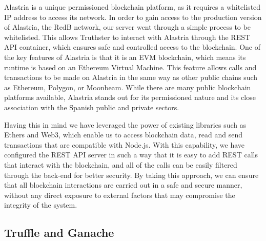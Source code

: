 \documentclass[target=mst,aauheader=]{thud}
\begin{document}
Alastria is a unique permissioned blockchain platform, as it requires a whitelisted IP address to access its network. In order to gain access to the production version of Alastria, the RedB network, our server went through a simple process to be whitelisted. This allows Truthster to interact with Alastria through the REST API container, which ensures safe and controlled access to the blockchain.
One of the key features of Alastria is that it is an EVM blockchain, which means its runtime is based on an Ethereum Virtual Machine\cite{evm}. This feature allows calls and transactions to be made on Alastria in the same way as other public chains such as Ethereum\cite{ethereum}, Polygon\cite{polygon}, or Moonbeam\cite{moonbeam}. While there are many public blockchain platforms available, Alastria stands out for its permissioned nature and its close association with the Spanish public and private sectors.\par
Having this in mind we have leveraged the power of existing libraries such as Ethers\cite{ethers} and Web3\cite{web3}, which enable us to access blockchain data, read and send transactions that are compatible with Node.js. With this capability, we have configured the REST API server in such a way that it is easy to add REST calls that interact with the blockchain, and all of the calls can be easily filtered through the back-end for better security. By taking this approach, we can ensure that all blockchain interactions are carried out in a safe and secure manner, without any direct exposure to external factors that may compromise the integrity of the system.

\subsection{Truffle and Ganache}
\end{document}
